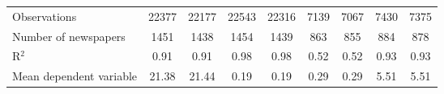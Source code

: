 {\begin{tabular}{l*{8}{c}}
\midrule
Observations        &       22377         &       22177         &       22543         &       22316         &        7139         &        7067         &        7430         &        7375         \\
Number of newspapers&        1451         &        1438         &        1454         &        1439         &         863         &         855         &         884         &         878         \\
R$^2$               &        0.91         &        0.91         &        0.98         &        0.98         &        0.52         &        0.52         &        0.93         &        0.93         \\
Mean dependent variable&       21.38         &       21.44         &        0.19         &        0.19         &        0.29         &        0.29         &        5.51         &        5.51         \\
\bottomrule
\end{tabular}
}

